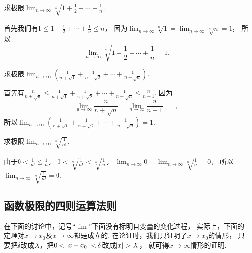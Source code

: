 \begin{example}
求极限\(\lim_{n\to\infty} \sqrt[n]{1+\frac12+\dotsb+\frac1n}\).
\begin{solution}
首先我们有\(1 \leq 1+\frac12+\dotsb+\frac1n \leq n\)，
因为\(\lim_{n\to\infty} \sqrt[n]{1} = \lim_{n\to\infty} \sqrt[n]{n} = 1\)，
所以\[
	\lim_{n\to\infty} \sqrt[n]{1+\frac12+\dotsb+\frac1n} = 1.
\]
\end{solution}
\end{example}

\begin{example}
求极限\(\lim_{n\to\infty} \left(\frac1{n+\sqrt1}+\frac1{n+\sqrt2}+\dotsb+\frac1{n+\sqrt{n}}\right)\).
\begin{solution}
首先有\(\frac{n}{n+\sqrt{n}}
\leq \frac1{n+\sqrt1}+\frac1{n+\sqrt2}+\dotsb+\frac1{n+\sqrt{n}}
\leq \frac{n}{n+1}\).
因为\[
	\lim_{n\to\infty} \frac{n}{n+\sqrt{n}}
	= \lim_{n\to\infty} \frac{n}{n+1} = 1,
\]
所以\(\lim_{n\to\infty} \left(\frac1{n+\sqrt1}+\frac1{n+\sqrt2}+\dotsb+\frac1{n+\sqrt{n}}\right) = 1\).
\end{solution}
\end{example}

\begin{example}
求极限\(\lim_{n\to\infty} \sqrt[n]{\frac1{n!}}\).
\begin{solution}
由于\(0 < \frac1{n!} \leq \frac1n\)，
\(0 < \sqrt[n]{\frac1{n!}} < \sqrt[n]{\frac1n}\)，
\(\lim_{n\to\infty} 0 = \lim_{n\to\infty} \sqrt[n]{\frac1n} = 0\)，
所以\(\lim_{n\to\infty} \sqrt[n]{\frac1{n!}} = 0\).
\end{solution}
\end{example}

\subsection{函数极限的四则运算法则}
在下面的讨论中，记号“\(\lim\)”下面没有标明自变量的变化过程，
实际上，下面的定理对\(x \to x_0\)及\(x \to \infty\)都是成立的.
在论证时，我们只证明了\(x \to x_0\)的情形，
只要把\(\delta\)改成\(X\)，把\(0<\abs{x-x_0}<\delta\)改成\(\abs{x}>X\)，
就可得\(x\to\infty\)情形的证明.

